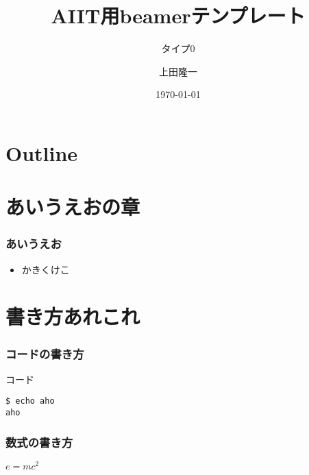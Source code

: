\documentclass[dvipdfmx]{beamer}
\title[AIIT用beamerテンプレート]{AIIT用beamerテンプレート}
\subtitle[タイプ0]{タイプ0}
\author{上田隆一}
\institute[産技大]{産業技術大学院大学}
\date{\today}
\begin{document}
\frame{\titlepage}
\section*{Outline}
\begin{frame}
  \tableofcontents
\end{frame}
\section{あいうえおの章}

\begin{frame}
\frametitle{あいうえお}
\begin{itemize}
	\item かきくけこ
\end{itemize}
\end{frame}

\section{書き方あれこれ}

\begin{frame}[containsverbatim]%
\frametitle{コードの書き方}
\begin{footnotesize}
\begin{block}{コード}
\begin{verbatim}
$ echo aho
aho
\end{verbatim}
\end{block}
\end{footnotesize}

\end{frame}

\begin{frame}
\frametitle{数式の書き方}

$e = mc^2$

\end{frame}
\end{document}
